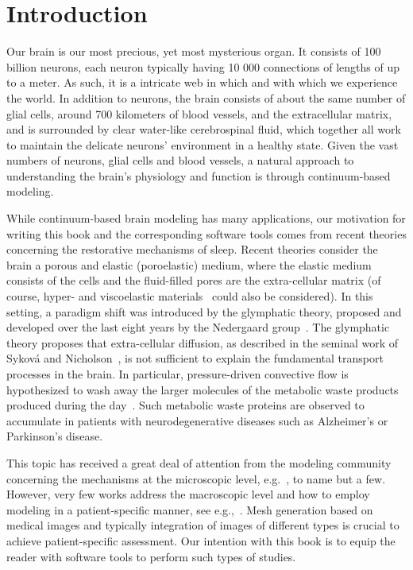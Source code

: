 \chapter{Introduction}
\label{chp:chp1}

Our brain is our most precious, yet most mysterious organ. It consists
of 100 billion neurons, each neuron typically having 10 000 connections
of lengths of up to a meter. As such, it is a intricate web in which
and with which we experience the world. In addition to neurons,
the brain consists of about the same number of glial cells, around 700
kilometers of blood vessels, and the extracellular matrix, and is
surrounded by clear water-like cerebrospinal fluid, which
together all work to maintain the delicate neurons' environment in a
healthy state. Given the vast numbers of neurons, glial cells and
blood vessels, a natural approach to understanding the brain's physiology
and function is through continuum-based modeling.

While continuum-based brain modeling has many applications, our
motivation for writing this book and the corresponding software tools
comes from recent theories concerning the restorative mechanisms of
sleep. Recent theories consider the brain a porous and elastic
(poroelastic) medium, where the elastic medium consists of the cells
and the fluid-filled pores are the extra-cellular matrix (of course, 
hyper- and viscoelastic materials~\cite{goriely2015mechanics,
  budday2019fifty} could also be considered). In this setting, a
paradigm shift was introduced by the glymphatic theory, proposed and
developed over the last eight years by the Nedergaard
group~\cite{iliff2012paravascular}. The glymphatic theory proposes
that extra-cellular diffusion, as described in the seminal work of
Sykov{\'a} and Nicholson~\cite{sykova2008diffusion}, is not sufficient
to explain the fundamental transport processes in the brain. In
particular, pressure-driven convective flow is hypothesized to wash
away the larger molecules of the metabolic waste products produced
during the day~\cite{iliff2012paravascular, jessen2015glymphatic,
  xie2013sleep}. Such metabolic waste proteins are observed to
accumulate in patients with neurodegenerative diseases such as
Alzheimer's or Parkinson's disease.

This topic has received a great deal of attention from the modeling
community concerning the mechanisms at the microscopic level,
e.g.~\cite{aldea2019cerebrovascular, daversin2020mechanisms,
  diem2017arterial, holter2017interstitial, ray2019analysis,
  sharp2019dispersion, smith2017test}, to name but a few. However,
very few works address the macroscopic level and how to employ
modeling in a patient-specific manner, see e.g.,~\cite{chou2016fully,
  lee2019mixed}. Mesh generation based on medical images and typically
integration of images of different types is crucial to achieve
patient-specific assessment. Our intention with this book is to equip
the reader with software tools to perform such types of studies.

